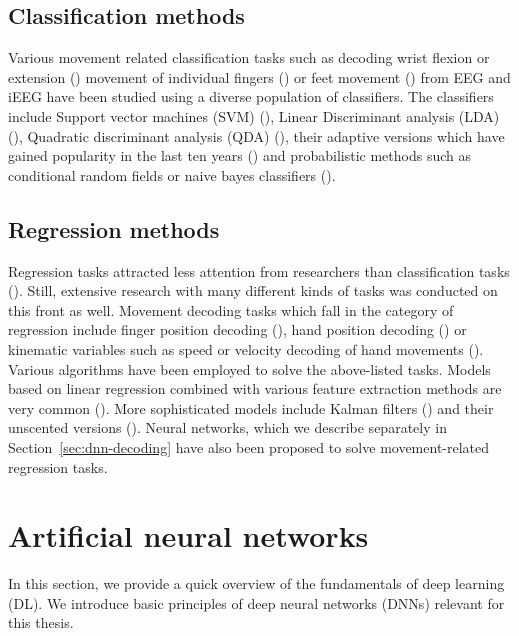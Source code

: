 \subsection{Classification methods}
Various movement related classification tasks such as decoding wrist flexion or extension (\cite{wrist-flexion}) movement of individual fingers (\cite{cond-rf-finger-class, lda-finger-movement-classification}) or feet movement (\cite{feet-movement}) from EEG and iEEG have been studied using a diverse population of classifiers.  
The classifiers include Support vector machines (SVM) (\cite{svm-alg}), Linear Discriminant analysis (LDA) (\cite{lda-paper}), Quadratic discriminant analysis (QDA) (\cite{qda-paper}), their adaptive versions which have gained popularity in the last ten years (\cite{lotte2018review}) and probabilistic methods such as conditional random fields or naive bayes classifiers (\cite{bayesian-decoding, cond-rf-finger-class}). 


\subsection{Regression methods}
Regression tasks attracted less attention from researchers than classification tasks (\cite{volkova-review}).
Still, extensive research with many different kinds of tasks was conducted on this front as well.
Movement decoding tasks which fall in the category of regression include finger position decoding (\cite{Pistohl2008PredictionOA}), hand position decoding (\cite{ball-2019}) or
kinematic variables such as speed or velocity decoding of hand movements (\cite{hammer-role-2013, hammer-predominance-2016, Hammer-2021, kalman-filters-velocity, linear-regression-eeg-hand-3d}).
Various algorithms have been employed to solve the above-listed tasks. 
Models based on linear regression combined with various feature extraction methods are very common (\cite{hammer-role-2013, hammer-predominance-2016, eeg-hand-moving, linear-regression-eeg-hand-3d}).
More sophisticated models include Kalman filters (\cite{kalman-filters-velocity}) and their unscented versions (\cite{uns-kalman-filters-gait-decoding}).
Neural networks, which we describe separately in Section~\ref{sec:dnn-decoding} have also been proposed to solve movement-related regression tasks.

\section{Artificial neural networks}\label{sec:artificial-neural-networks}
In this section, we provide a quick overview of the fundamentals of deep learning (DL). 
We introduce basic principles of deep neural networks (DNNs) relevant for this thesis.


